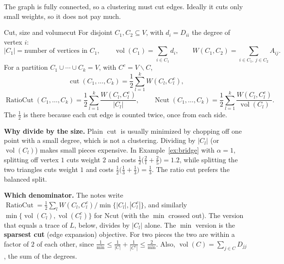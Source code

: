 \documentclass[11pt]{article}
\begin{document}
The graph is fully connected, so a clustering must cut edges. Ideally it cuts only small weights, so it does not pay much.

\begin{definition}{Cut, size and volume}{cut}
For disjoint $C_1,C_2\subseteq V$, with $d_i=D_{ii}$ the degree of vertex $i$:
\[
|C_1|=\text{number of vertices in }C_1,\qquad \operatorname{vol}(C_1)=\sum_{i\in C_1}d_i,\qquad W(C_1,C_2)=\sum_{i\in C_1,\ j\in C_2}A_{ij}.
\]
For a partition $C_1\cup\cdots\cup C_k=V$, with $C^c=V\smallsetminus C$,
\[
\operatorname{cut}(C_1,\dots,C_k)=\frac12\sum_{l=1}^kW(C_l,C_l^c),
\]
\[
\operatorname{RatioCut}(C_1,\dots,C_k)=\frac12\sum_{l=1}^k\frac{W(C_l,C_l^c)}{|C_l|},\qquad
\operatorname{Ncut}(C_1,\dots,C_k)=\frac12\sum_{l=1}^k\frac{W(C_l,C_l^c)}{\operatorname{vol}(C_l)} .
\]
The $\frac12$ is there because each cut edge is counted twice, once from each side.
\end{definition}

\textbf{Why divide by the size.} Plain $\operatorname{cut}$ is usually minimized by chopping off one point with a small degree, which is not a clustering. Dividing by $|C_l|$ (or $\operatorname{vol}(C_l)$) makes small pieces expensive. In Example~\ref{ex:bridge} with $\alpha=1$, splitting off vertex $1$ cuts weight $2$ and costs $\frac12\big(\frac21+\frac25\big)=1.2$, while splitting the two triangles cuts weight $1$ and costs $\frac12\big(\frac13+\frac13\big)=\frac13$. The ratio cut prefers the balanced split.

\begin{careful}
\textbf{Which denominator.} The notes write $\operatorname{RatioCut}=\frac12\sum_l W(C_l,C_l^c)/\min\{|C_l|,|C_l^c|\}$, and similarly $\min\{\operatorname{vol}(C_l),\operatorname{vol}(C_l^c)\}$ for Ncut (with the $\min$ crossed out). The version that equals a trace of $L$, below, divides by $|C_l|$ alone. The $\min$ version is the \textbf{sparsest cut} (edge expansion) objective. For two pieces the two are within a factor of $2$ of each other, since $\frac1{\min}\le\frac1{|C|}+\frac1{|C^c|}\le\frac2{\min}$. Also, $\operatorname{vol}(C)=\sum_{j\in C}D_{jj}$, the sum of the degrees.
\end{careful}
\end{document}
